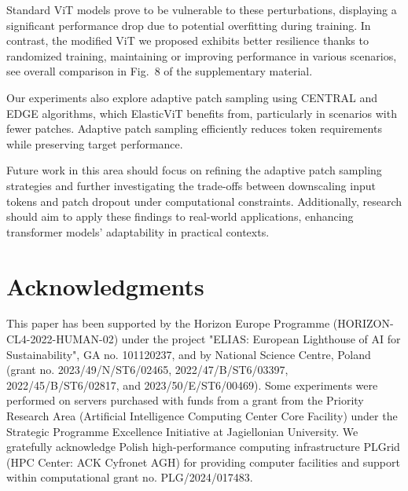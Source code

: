 \documentclass[10pt,twocolumn,letterpaper]{article}
\begin{document}
Standard ViT models prove to be vulnerable to these perturbations, displaying a significant performance drop due to potential overfitting during training. In contrast, the modified ViT we proposed exhibits better resilience thanks to randomized training, maintaining or improving performance in various scenarios, see overall comparison in Fig.~8 of the supplementary material.

Our experiments also explore adaptive patch sampling using CENTRAL and EDGE algorithms, which ElasticViT benefits from, particularly in scenarios with fewer patches. Adaptive patch sampling efficiently reduces token requirements while preserving target performance.

Future work in this area should focus on refining the adaptive patch sampling strategies and further investigating the trade-offs between downscaling input tokens and patch dropout under computational constraints. Additionally, research should aim to apply these findings to real-world applications, enhancing transformer models' adaptability in practical contexts.

\section*{Acknowledgments}

{\small
This paper has been supported by the Horizon Europe Programme (HORIZON-CL4-2022-HUMAN-02) under the project "ELIAS: European Lighthouse of AI for Sustainability", GA no. 101120237, and by National Science Centre, Poland (grant no. 2023/49/N/ST6/02465, 2022/47/B/ST6/03397, 2022/45/B/ST6/02817, and 2023/50/E/ST6/00469). Some experiments were performed on servers purchased with funds from a grant from the Priority Research Area (Artificial Intelligence Computing Center Core Facility) under the Strategic Programme Excellence Initiative at Jagiellonian University. We gratefully acknowledge Polish high-performance computing infrastructure PLGrid (HPC Center: ACK Cyfronet AGH) for providing computer facilities and support within computational grant no. PLG/2024/017483.
}


{\small


}
\end{document}
